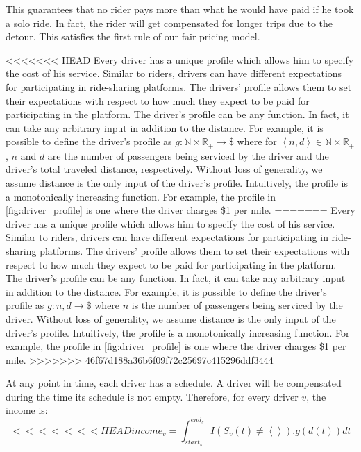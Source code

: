 \noindent This guarantees that no rider pays more than what he would have paid if he took a solo ride. In fact, the rider will get compensated for longer trips due to the detour. This satisfies the first rule of our fair pricing model.

<<<<<<< HEAD
Every driver has a unique profile which allows him to specify the cost of his service. Similar to riders, drivers can have different expectations for participating in ride-sharing platforms. The drivers' profile allows them to set their expectations with respect to how much they expect to be paid for participating in the platform. The driver's profile can be any function. In fact, it can take any arbitrary input in addition to the distance. For example, it is possible to define the driver's profile as $g: \mathbb{N} \times \mathbb{R}_{+}  \rightarrow \$$ where for $\left\langle n, d \right\rangle \in \mathbb{N} \times \mathbb{R}_{+}$, $n$ and $d$ are the number of passengers being serviced by the driver and the driver's total traveled distance, respectively. Without loss of generality, we assume distance is the only input of the driver's profile. Intuitively, the profile is a monotonically increasing function. For example, the profile in \cref{fig:driver_profile} is one where the driver charges \$1 per mile.
=======
Every driver has a unique profile which allows him to specify the cost of his service. Similar to riders, drivers can have different expectations for participating in ride-sharing platforms. The drivers' profile allows them to set their expectations with respect to how much they expect to be paid for participating in the platform. The driver's profile can be any function. In fact, it can take any arbitrary input in addition to the distance. For example, it is possible to define the driver's profile as $g: n, d \rightarrow \$$ where $n$ is the number of passengers being serviced by the driver. Without loss of generality, we assume distance is the only input of the driver's profile. Intuitively, the profile is a monotonically increasing function. For example, the profile in \cref{fig:driver_profile} is one where the driver charges \$1 per mile.
>>>>>>> 46f67d188a36b6f09f72c25697c415296ddf3444

At any point in time, each driver has a schedule. A driver will be compensated during the time its schedule is not empty. Therefore, for every driver $v$, the income is:
\vspace{-2mm}
\begin{equation}
\label{eq:payment}
<<<<<<< HEAD
income_v = \int_{start_s}^{end_s} I\left( S_v(t) \neq \left\langle \right\rangle\right).g(d(t))dt
\end{equation}

